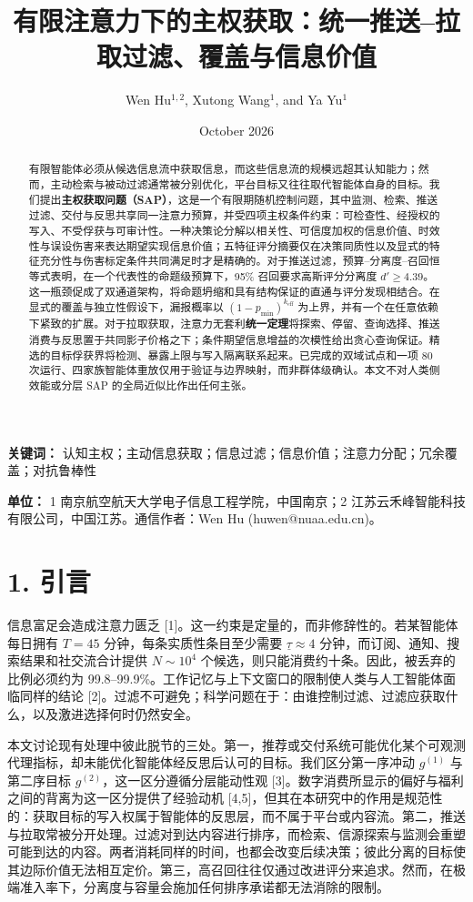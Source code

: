 \documentclass[
  chinese,
  11pt]{article}
\title{有限注意力下的主权获取：统一推送--拉取过滤、覆盖与信息价值}
\author{Wen Hu\(^{1,2}\), Xutong Wang\(^{1}\), and Ya Yu\(^{1}\)}
\date{October 2026}
\begin{document}
\maketitle
\begin{abstract}
有限智能体必须从候选信息流中获取信息，而这些信息流的规模远超其认知能力；然而，主动检索与被动过滤通常被分别优化，平台目标又往往取代智能体自身的目标。我们提出\textbf{主权获取问题（SAP）}，这是一个有限期随机控制问题，其中监测、检索、推送过滤、交付与反思共享同一注意力预算，并受四项主权条件约束：可检查性、经授权的写入、不受俘获与可审计性。一种决策论分解以相关性、可信度加权的信息价值、时效性与误设伤害来表达期望实现信息价值；五特征评分摘要仅在决策同质性以及显式的特征充分性与伤害标定条件共同满足时才是精确的。对于推送过滤，预算--分离度--召回恒等式表明，在一个代表性的命题级预算下，95\% 召回要求高斯评分分离度 \(d'\geq4.39\)。这一瓶颈促成了双通道架构，将命题坍缩和具有结构保证的直通与评分发现相结合。在显式的覆盖与独立性假设下，漏报概率以 \((1-p_{\min})^{k_{\mathrm{eff}}}\) 为上界，并有一个在任意依赖下紧致的扩展。对于拉取获取，注意力无套利\textbf{统一定理}将探索、停留、查询选择、推送消费与反思置于共同影子价格之下；条件期望信息增益的次模性给出贪心查询保证。精选的目标俘获界将检测、暴露上限与写入隔离联系起来。已完成的双域试点和一项 80 次运行、四家族智能体重放仅用于验证与边界映射，而非群体级确认。本文不对人类侧效能或分层 SAP 的全局近似比作出任何主张。
\end{abstract}

\textbf{关键词：} 认知主权；主动信息获取；信息过滤；信息价值；注意力分配；冗余覆盖；对抗鲁棒性

\textbf{单位：} 1 南京航空航天大学电子信息工程学院，中国南京；2 江苏云禾峰智能科技有限公司，中国江苏。通信作者：Wen Hu (huwen@nuaa.edu.cn)。

\section{1. 引言}\label{ux5f15ux8a00}

信息富足会造成注意力匮乏 {[}1{]}。这一约束是定量的，而非修辞性的。若某智能体每日拥有 \(T=45\) 分钟，每条实质性条目至少需要 \(\underline\tau\approx4\) 分钟，而订阅、通知、搜索结果和社交流合计提供 \(N\sim10^4\) 个候选，则只能消费约十条。因此，被丢弃的比例必须约为 99.8--99.9\%。工作记忆与上下文窗口的限制使人类与人工智能体面临同样的结论 {[}2{]}。过滤不可避免；科学问题在于：由谁控制过滤、过滤应获取什么，以及激进选择何时仍然安全。

本文讨论现有处理中彼此脱节的三处。第一，推荐或交付系统可能优化某个可观测代理指标，却未能优化智能体经反思后认可的目标。我们区分第一序冲动 \(g^{(1)}\) 与第二序目标 \(g^{(2)}\)，这一区分遵循分层能动性观 {[}3{]}。数字消费所显示的偏好与福利之间的背离为这一区分提供了经验动机 {[}4,5{]}，但其在本研究中的作用是规范性的：获取目标的写入权属于智能体的反思层，而不属于平台或内容流。第二，推送与拉取常被分开处理。过滤对到达内容进行排序，而检索、信源探索与监测会重塑可能到达的内容。两者消耗同样的时间，也都会改变后续决策；彼此分离的目标使其边际价值无法相互定价。第三，高召回往往仅通过改进评分来追求。然而，在极端准入率下，分离度与容量会施加任何排序承诺都无法消除的限制。
\end{document}
